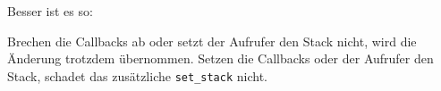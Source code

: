 Besser ist es so:

\begin{Shaded}
\begin{Highlighting}[]
\OperatorTok{(}
    \OperatorTok{(}
        \OperatorTok{,}
        \OperatorTok{,}
        \OperatorTok{,}
        \OperatorTok{,}
    \OperatorTok{)}
            \OperatorTok{:}\OperatorTok{()}
            \OperatorTok{:}\OperatorTok{(}\OperatorTok{,} \OperatorTok{)}
        \OperatorTok{:}\OperatorTok{():}\OperatorTok{(}
            \OperatorTok{,}
            \OperatorTok{:}\OperatorTok{(),}
        \OperatorTok{)}
\OperatorTok{)}
\end{Highlighting}
\end{Shaded}

Brechen die Callbacks ab oder setzt der Aufrufer den Stack nicht, wird
die Änderung trotzdem übernommen. Setzen die Callbacks oder der Aufrufer
den Stack, schadet das zusätzliche \texttt{set\_\allowbreak{}stack}
nicht.
